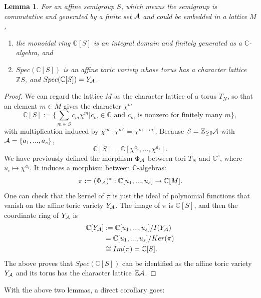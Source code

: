 \documentclass[11pt]{article}
\newtheorem{lemma}[thm]{Lemma}
\newcommand{\cplx}{\mathbb C}
\newcommand{\intg}{\mathbb Z}
\newcommand{\cala}{{\cal A}}
\begin{document}
\begin{lemma}
 For an affine semigroup $S$, which means the semigroup is commutative and generated by a finite set $\cala$ and could be embedded in a lattice $M$,
\begin{enumerate}[label=(\alph*)]
 \item the monoidal ring $\cplx[S]$ is an integral domain and finitely generated as a $\cplx$-algebra, and
 \item $Spec(\cplx[S])$ is an affine toric variety whose torus has a character lattice $\intg S$, and $Spec(\cplx[S])=Y_{\cala}$.
\end{enumerate}
\end{lemma}
\begin{proof}
We can regard the lattice $M$ as the character lattice of a torus $T_N$,  so that an element $m\in M$ gives the character $\chi^m$
\begin{equation*}
	\cplx[S]:=\{\sum_{m\in S} c_m \chi^m|c_m\in \cplx \text{ and } c_m\text{ is nonzero for finitely many }m\},
\end{equation*}
with multiplication induced by $\chi^m\cdot\chi^{m'}=\chi^{m+m'}$. Because $S=\intg_{\geq0}\cala$ with $\cala=\{a_1,...,a_s\}$,
\begin{equation*}
	\cplx[S]=\cplx[\chi^{a_1},...,\chi^{a_s}].
\end{equation*}
We have previously defined the morphism $\Phi_\cala$ between tori $T_N$ and $\cplx^s$, where $u_i\mapsto \chi^{a_i}$. It induces a morphism between $\cplx$-algebras:
\begin{equation*}
\pi:=(\Phi_{\cala})^*: \cplx[u_1,...,u_s]\rightarrow \cplx[M].
\end{equation*}
One can check that the kernel of $\pi$ is just the ideal of polynomial functions that vanish on  the affine toric variety $Y_{\cala}$. The image of $\pi$ is $\cplx[S]$, and then the coordinate ring of $Y_\cala$ is 
\begin{equation*}
\begin{aligned}
\cplx[Y_{\cala}]&:=\cplx[u_1,...,u_s]/I(Y_{\cala})\\
&=\cplx[u_1,...,u_s]/Ker(\pi)\\
&\cong Im(\pi)=\cplx[S].
\end{aligned}
\end{equation*}
The above proves that $Spec(\cplx[S])$ can be identified as the affine toric variety $Y_{\cala}$ and its torus has the character lattice $\intg \cala$. 
\end{proof}
With the above two lemmas, a direct corollary goes:
\end{document}
